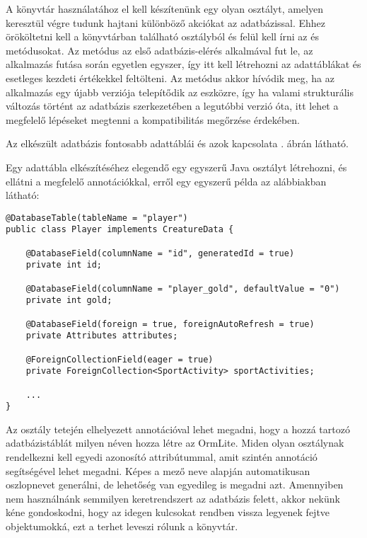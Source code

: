 A könyvtár használatához el kell készítenünk egy olyan osztályt, amelyen keresztül végre tudunk hajtani különböző akciókat az adatbázissal. 
Ehhez örököltetni kell a könyvtárban található  osztályból és felül kell írni az  és  metódusokat.
Az  metódus az első adatbázis-elérés alkalmával fut le, az alkalmazás futása során egyetlen egyszer, így itt kell létrehozni az adattáblákat és esetleges kezdeti értékekkel feltölteni. 
Az  metódus akkor hívódik meg, ha az alkalmazás egy újabb verziója telepítődik az eszközre, így ha valami strukturális változás történt az adatbázis szerkezetében a legutóbbi verzió óta, itt lehet a megfelelő lépéseket megtenni a kompatibilitás megőrzése érdekében. 

Az elkészült adatbázis fontosabb adattáblái és azok kapcsolata . ábrán látható. 


Egy adattábla elkészítéséhez elegendő egy egyszerű Java osztályt létrehozni, és ellátni a megfelelő annotációkkal, erről egy egyszerű példa az alábbiakban látható:

\begin{lstlisting}
@DatabaseTable(tableName = "player")
public class Player implements CreatureData {

    @DatabaseField(columnName = "id", generatedId = true)
    private int id;

    @DatabaseField(columnName = "player_gold", defaultValue = "0")
    private int gold;

    @DatabaseField(foreign = true, foreignAutoRefresh = true)
    private Attributes attributes;

    @ForeignCollectionField(eager = true)
    private ForeignCollection<SportActivity> sportActivities;

    ...
}
\end{lstlisting}

Az osztály tetején elhelyezett  annotációval lehet megadni, hogy a hozzá tartozó adatbázistáblát milyen néven hozza létre az OrmLite. 
Miden olyan osztálynak rendelkezni kell egyedi azonosító attribútummal, amit szintén annotáció segítségével lehet megadni. 
Képes a mező neve alapján automatikusan oszlopnevet generálni, de lehetőség van egyedileg is megadni azt. 
Amennyiben nem használnánk semmilyen keretrendszert az adatbázis felett, akkor nekünk kéne gondoskodni, hogy az idegen kulcsokat rendben vissza legyenek fejtve objektumokká, ezt a terhet leveszi rólunk a könyvtár. 

